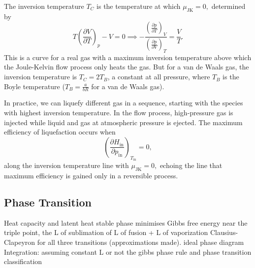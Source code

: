 \documentclass{article}
\theoremstyle{nonumberplain}
\begin{document}
The inversion temperature $T_C$ is the temperature at which $\mu_{\mathrm{JK} } =0,$ determined by 
\[
    T \left( \frac{\partial V}{\partial T} \right)_{p} - V= 0
    \implies 
    -\frac{\left( \frac{\partial p}{\partial T} \right)_{V} }{\left( \frac{\partial p}{\partial V} \right)_{T} } = \frac{V}{T}.
\] 
This is a curve for a real gas with a maximum inversion temperature above which the Joule-Kelvin flow process only heats the gas. But for a van de Waals gas, the inversion temperature is $T_C = 2 T_B$, a constant at all pressure, where $T_B$ is the Boyle temperature ($T_B = \frac{a}{b R}$ for a van de Waals gas).

In practice, we can liquefy different gas in a sequence, starting with the species with highest inversion temperature. In the flow process, high-pressure gas is injected while liquid and gas at atmospheric pressure is ejected. The maximum efficiency of liquefaction occurs when 
\[
    \left(\frac{\partial H_{\mathrm{in}}}{\partial p_\mathrm{in}}  \right)_{T_\mathrm{in}} = 0,
\] along the inversion temperature line with $\mu_{\mathrm{JK} } = 0,$ echoing the line that maximum efficiency is gained only in a reversible process. 

\subsection{Phase Transition}
Heat capacity and latent heat
stable phase minimises Gibbs free energy 
near the triple point, the L of sublimation of L of fusion + L of vaporization 
Clausius-Clapeyron for all three transitions (approximations made). ideal phase diagram
Integration: assuming constant L or not
the gibbs phase rule and phase transition classification
\end{document}
